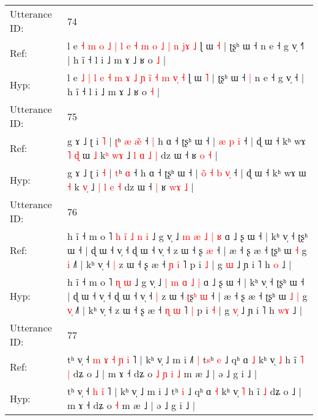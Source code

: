 \documentclass[10pt]{article}
\DeclareRobustCommand{\hl}[1]{{\textcolor{red}{#1}}}
\begin{document}
\begin{longtable}{ll}
 \\
\midrule
Utterance ID: & 74 \\
Ref: & l e \hl{˧} \hl{m} \hl{o} \hl{˩} \hl{|} \hl{l} \hl{e} \hl{˧} \hl{m} \hl{o}\hl{ }\hl{˩} \hl{|} \hl{n} \hl{j}\hl{ɤ} \hl{˩} ɭ ɯ \hl{˧} | ʈʂʰ ɯ ˧\hl{}\hl{} n e ˧ g v̩ ˧\hl{˥} | h ĩ ˧ l i ˩ m ɤ ˩ ʁ o \hl{˩} |
 \\
Hyp: & l e \hl{˩} \hl{|} \hl{l} \hl{e} \hl{˧} \hl{m} \hl{ɤ} \hl{˩} \hl{ɲ} \hl{}\hl{i}\hl{̃} \hl{˧} \hl{m} \hl{v}\hl{̩} \hl{˧} ɭ ɯ \hl{˥} | ʈʂʰ ɯ ˧\hl{ }\hl{|} n e ˧ g v̩ ˧\hl{} | h ĩ ˧ l i ˩ m ɤ ˩ ʁ o \hl{˧} |
 \\
\midrule
Utterance ID: & 75 \\
Ref: & g ɤ ˩ ʈ i \hl{˥} | \hl{ʈ}ʰ\hl{ }\hl{æ} \hl{æ}\hl{̃} ˧\hl{ }\hl{|} h ɑ ˧ ʈʂʰ ɯ ˧ |\hl{}\hl{}\hl{} \hl{æ} \hl{p} \hl{}\hl{i} ˧ | ɖ ɯ ˧ kʰ wɤ\hl{ }\hl{˥}\hl{ }\hl{ɖ} ɯ \hl{˩} k\hl{ʰ} \hl{w}\hl{ɤ} ˩ \hl{l} \hl{ɑ} \hl{˩} \hl{|} dz ɯ ˧\hl{}\hl{} ʁ \hl{}\hl{o} \hl{˧} |
 \\
Hyp: & g ɤ ˩ ʈ i \hl{˧} | \hl{t}ʰ\hl{}\hl{} \hl{}\hl{ɑ} ˧\hl{}\hl{} h ɑ ˧ ʈʂʰ ɯ ˧ |\hl{ }\hl{o}\hl{̃} \hl{˧} \hl{b} \hl{v}\hl{̩} ˧ | ɖ ɯ ˧ kʰ wɤ\hl{}\hl{}\hl{}\hl{} ɯ \hl{˧} k\hl{} \hl{v}\hl{̩} ˩ \hl{|} \hl{l} \hl{e} \hl{˧} dz ɯ ˧\hl{ }\hl{|} ʁ \hl{w}\hl{ɤ} \hl{˩} |
 \\
\midrule
Utterance ID: & 76 \\
Ref: & h ĩ ˧ m o ˥\hl{ }\hl{h}\hl{ }\hl{i}\hl{̃}\hl{ }\hl{˩} \hl{n} \hl{i} ˩ g v̩ ˩ \hl{m} \hl{æ} \hl{˩} \hl{|} \hl{ʁ} ɑ ˩ ʂ ɯ ˧ | kʰ v̩ ˧ ʈʂʰ ɯ ˧ | ɖ ɯ ˧ v̩ ˧ ɖ ɯ ˧ v̩ ˧\hl{}\hl{} z ɯ ˧ \hl{}ʂ\hl{} \hl{æ} ˧ | æ ˧ ʂ æ ˧ ʈʂʰ ɯ\hl{}\hl{} \hl{˧} g \hl{}\hl{i} ˩˥ | kʰ v̩ ˧\hl{ }\hl{|} z ɯ ˧ ʂ æ ˧ \hl{ɲ} \hl{i} ˥\hl{}\hl{} p i \hl{˩} | g \hl{}\hl{ɯ} ˩ ɲ i ˥ h \hl{}\hl{o} ˩ |
 \\
Hyp: & h ĩ ˧ m o ˥\hl{}\hl{}\hl{}\hl{}\hl{}\hl{}\hl{} \hl{ɳ} \hl{ɯ} ˩ g v̩ ˩ \hl{|} \hl{m} \hl{ɑ} \hl{˩} \hl{|} ɑ ˩ ʂ ɯ ˧ | kʰ v̩ ˧ ʈʂʰ ɯ ˧ | ɖ ɯ ˧ v̩ ˧ ɖ ɯ ˧ v̩ ˧\hl{ }\hl{|} z ɯ ˧ \hl{ʈ}ʂ\hl{ʰ} \hl{ɯ} ˧ | æ ˧ ʂ æ ˧ ʈʂʰ ɯ\hl{ }\hl{˩} \hl{|} g \hl{v}\hl{̩} ˩˥ | kʰ v̩ ˧\hl{}\hl{} z ɯ ˧ ʂ æ ˧ \hl{ɳ} \hl{ɯ} ˥\hl{ }\hl{|} p i \hl{˧} | g \hl{v}\hl{̩} ˩ ɲ i ˥ h \hl{w}\hl{ɤ} ˩ |
 \\
\midrule
Utterance ID: & 77 \\
Ref: & tʰ v̩ ˧\hl{ }\hl{m}\hl{ }\hl{ɤ} \hl{˧} \hl{ɲ}\hl{ }\hl{i} ˥ | kʰ v̩ ˩ m i ˩\hl{˥}\hl{ }\hl{|} t\hl{s}ʰ \hl{e} ˩ qʰ ɑ \hl{˩} kʰ v̩ \hl{˩} h ĩ\hl{ }\hl{˥} \hl{|} dʑ o ˩ | m ɤ ˧ dʑ o\hl{ }\hl{˩}\hl{ }\hl{ɲ}\hl{ }\hl{i} \hl{˩} m æ ˩ | ə ˩ g i ˩ |
 \\
Hyp: & tʰ v̩ ˧\hl{}\hl{}\hl{}\hl{} \hl{h} \hl{}\hl{i}\hl{̃} ˥ | kʰ v̩ ˩ m i ˩\hl{}\hl{}\hl{} t\hl{}ʰ \hl{i} ˩ qʰ ɑ \hl{˧} kʰ v̩ \hl{˥} h ĩ\hl{}\hl{} \hl{˩} dʑ o ˩ | m ɤ ˧ dʑ o\hl{}\hl{}\hl{}\hl{}\hl{}\hl{} \hl{˧} m æ ˩ | ə ˩ g i ˩ |

\end{longtable}
\end{document}
